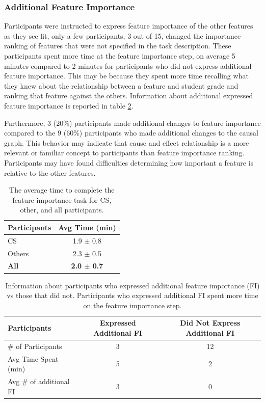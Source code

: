 \subsubsection { Additional Feature Importance }
Participants were instructed to express feature importance of the other features as they see fit, only a few participants, 3 out of 15, changed the importance ranking of features that were not specified in the task description. These participants spent more time at the feature importance step, on average 5 minutes compared to 2 minutes for participants who did not express additional feature importance.  This may be because they spent more time recalling what they knew about the relationship between a feature and student grade and ranking that feature against the others. Information about additional expressed feature importance is reported in table \ref{ExpressedAdditionalImportance}.

Furthermore, 3 (20\%) participants made additional changes to feature importance compared to the 9 (60\%) participants who made additional changes to the causal graph. This behavior may indicate that cause and effect relationship is a more relevant or familiar concept to participants than feature importance ranking. Participants may have found difficulties determining how important a feature is relative to the other features.

\begin{table}[]
\centering
\begin{tabular}{lc}
\hline
Participants    & Avg Time (min) \\ \hline
CS     & 1.9 $\pm$ 0.8              \\
Others & 2.3  $\pm$ 0.5            \\ \hline
\textbf{All}    & \textbf{2.0 $\pm$ 0.7 }            \\ \hline
\end{tabular}
\caption{The average time to complete the feature importance task for CS, other, and all participants.}
\label{FeatureImportanceTaskTime}
\end{table}

\begin{table}[]
\centering
\begin{tabular}{lcc}
\hline
Participants            & Expressed Additional FI & Did Not Express Additional FI \\ \hline
\# of Participants      & 3                      & 12                            \\
Avg Time Spent (min)    & 5                       & 2                             \\
Avg \# of additional FI & 3                      & 0                            \\ \hline
\end{tabular}
\caption{Information about participants who expressed additional feature importance (FI) vs those that did not. Participants who expressed additional FI spent more time on the feature importance step. }
\label{ExpressedAdditionalImportance}
\end{table}

